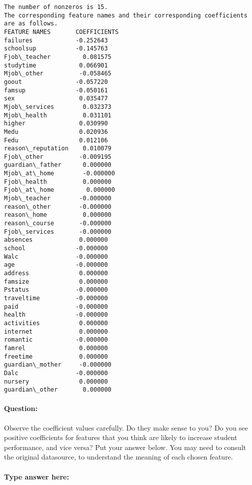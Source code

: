 \documentclass[11pt]{article}
\begin{document}
    \begin{Verbatim}[commandchars=\\\{\}]
The number of nonzeros is 15.
The corresponding feature names and their corresponding coefficients are as follows.
FEATURE NAMES       COEFFICIENTS
failures            -0.252643
schoolsup           -0.145763
Fjob\_teacher         0.081575
studytime            0.066901
Mjob\_other          -0.058465
goout               -0.057220
famsup              -0.050161
sex                  0.035477
Mjob\_services        0.032373
Mjob\_health          0.031101
higher               0.030990
Medu                 0.020936
Fedu                 0.012106
reason\_reputation    0.010079
Fjob\_other          -0.009195
guardian\_father      0.000000
Mjob\_at\_home        -0.000000
Fjob\_health          0.000000
Fjob\_at\_home         0.000000
Mjob\_teacher        -0.000000
reason\_other        -0.000000
reason\_home          0.000000
reason\_course       -0.000000
Fjob\_services       -0.000000
absences             0.000000
school              -0.000000
Walc                -0.000000
age                 -0.000000
address              0.000000
famsize              0.000000
Pstatus             -0.000000
traveltime          -0.000000
paid                -0.000000
health              -0.000000
activities           0.000000
internet             0.000000
romantic            -0.000000
famrel               0.000000
freetime             0.000000
guardian\_mother     -0.000000
Dalc                -0.000000
nursery              0.000000
guardian\_other       0.000000

    \end{Verbatim}

    \hypertarget{question}{%
\paragraph{Question:}\label{question}}

Observe the coefficient values carefully. Do they make sense to you? Do
you see positive coefficients for features that you think are likely to
increase student performance, and vice versa? Put your answer below. You
may need to consult the original datasource, to understand the meaning
of each chosen feature.

    \hypertarget{type-answer-here}{%
\paragraph{Type answer here:}\label{type-answer-here}}
\end{document}
